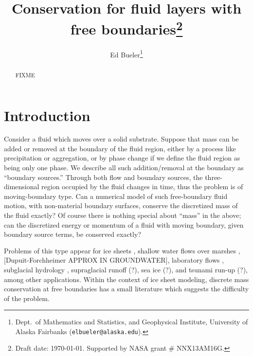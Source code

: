 \documentclass[final,leqno,onefignum,onetabnum]{siamltex1213bueler}
\title{Conservation for fluid layers with free boundaries\thanks{Draft date: \today.  Supported by NASA grant \# NNX13AM16G.}}
\author{Ed Bueler\thanks{Dept.~of Mathematics and Statistics, and Geophysical Institute, University of Alaska Fairbanks (\texttt{elbueler@alaska.edu}).}}
\begin{document}
\maketitle
{}%

\begin{abstract}
FIXME
\end{abstract}




\pagestyle{myheadings}
\thispagestyle{plain}


\section{Introduction}  \label{sec:intro}

Consider a fluid which moves over a solid substrate.  Suppose that mass can be added or removed at the boundary of the fluid region, either by a process like precipitation or aggregation, or by phase change if we define the fluid region as being only one phase.  We describe all such addition/removal at the boundary as ``boundary sources.''  Through both flow and boundary sources, the three-dimensional region occupied by the fluid changes in time, thus the problem is of moving-boundary type.  Can a numerical model of such free-boundary fluid motion, with non-material boundary surfaces, conserve the discretized mass of the fluid exactly?  Of course there is nothing special about ``mass'' in the above; can the discretized energy or momentum of a fluid with moving boundary, given boundary source terms, be conserved exactly?

Problems of this type appear for ice sheets \cite{BLKCB,CDDSV,EgholmNielsen2010,JouvetBueler2012}, shallow water flows over marshes \cite{AlonsoSantillanaDawson}, [Dupuit-Forchheimer APPROX IN GROUNDWATER], laboratory flows \cite{Kondic,PeglerWorster2012,SayagWorster2013}, subglacial hydrology \cite{AschwandenBuelerKhroulevBlatter,BuelervanPeltDRAFT,Schoofetal2012}, supraglacial runoff (?), sea ice (?), and tsunami run-up (?), among other applications.  Within the context of ice sheet modeling, discrete mass conservation at free boundaries has a small literature \cite{Albrechtetal2011,JaroschSchoofAnslow2013} which suggests the difficulty of the problem.
\end{document}
